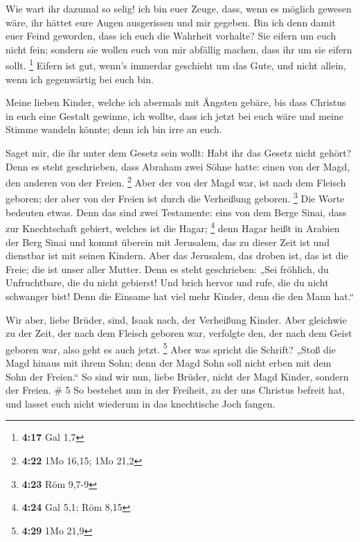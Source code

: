  Wie wart ihr dazumal so selig! ich bin euer Zeuge, dass,
wenn es möglich gewesen wäre, ihr hättet eure Augen ausgerissen und mir
gegeben.  Bin ich denn damit euer Feind geworden, dass ich
euch die Wahrheit vorhalte?  Sie eifern um euch nicht fein;
sondern sie wollen euch von mir abfällig machen, dass ihr um sie eifern
sollt. \footnote{\textbf{4:17} Gal 1,7}  Eifern ist gut,
wenn's immerdar geschieht um das Gute, und nicht allein, wenn ich
gegenwärtig bei euch bin.

 Meine lieben Kinder, welche ich abermals mit Ängsten
gebäre, bis dass Christus in euch eine Gestalt gewinne, 
ich wollte, dass ich jetzt bei euch wäre und meine Stimme wandeln
könnte; denn ich bin irre an euch.

 Saget mir, die ihr unter dem Gesetz sein wollt: Habt ihr
das Gesetz nicht gehört?  Denn es steht geschrieben, dass
Abraham zwei Söhne hatte: einen von der Magd, den anderen von der
Freien. \footnote{\textbf{4:22} 1Mo 16,15; 1Mo 21,2}  Aber
der von der Magd war, ist nach dem Fleisch geboren; der aber von der
Freien ist durch die Verheißung geboren. \footnote{\textbf{4:23} Röm
  9,7-9}  Die Worte bedeuten etwas. Denn das sind zwei
Testamente: eins von dem Berge Sinai, dass zur Knechtschaft gebiert,
welches ist die Hagar; \footnote{\textbf{4:24} Gal 5,1; Röm 8,15}
 denn Hagar heißt in Arabien der Berg Sinai und kommt
überein mit Jerusalem, das zu dieser Zeit ist und dienstbar ist mit
seinen Kindern.  Aber das Jerusalem, das droben ist, das
ist die Freie; die ist unser aller Mutter.  Denn es steht
geschrieben: „Sei fröhlich, du Unfruchtbare, die du nicht gebierst! Und
brich hervor und rufe, die du nicht schwanger bist! Denn die Einsame hat
viel mehr Kinder, denn die den Mann hat.``

 Wir aber, liebe Brüder, sind, Isaak nach, der Verheißung
Kinder.  Aber gleichwie zu der Zeit, der nach dem Fleisch
geboren war, verfolgte den, der nach dem Geist geboren war, also geht es
auch jetzt. \footnote{\textbf{4:29} 1Mo 21,9}  Aber was
spricht die Schrift? „Stoß die Magd hinaus mit ihrem Sohn; denn der Magd
Sohn soll nicht erben mit dem Sohn der Freien.``  So sind
wir nun, liebe Brüder, nicht der Magd Kinder, sondern der Freien. \# 5
 So bestehet nun in der Freiheit, zu der uns Christus
befreit hat, und lasset euch nicht wiederum in das knechtische Joch
fangen.

